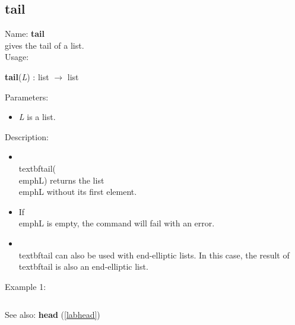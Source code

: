 \subsection{tail}
\label{labtail}
\noindent Name: \textbf{tail}\\
gives the tail of a list.\\
\noindent Usage: 
\begin{center}
\textbf{tail}(\emph{L}) : \textsf{list} $\rightarrow$ \textsf{list}\\
\end{center}
Parameters: 
\begin{itemize}
\item \emph{L} is a list.
\end{itemize}
\noindent Description: \begin{itemize}

\item \\textbf{tail}(\\emph{L}) returns the list \\emph{L} without its first element.\n
\item If \\emph{L} is empty, the command will fail with an error.\n
\item \\textbf{tail} can also be used with end-elliptic lists. In this case, the result of\n   \\textbf{tail} is also an end-elliptic list.\n\end{itemize}
\noindent Example 1: 
\begin{center}\begin{minipage}{15cm}\begin{Verbatim}[frame=single]
\end{Verbatim}
\end{minipage}\end{center}
See also: \textbf{head} (\ref{labhead})
